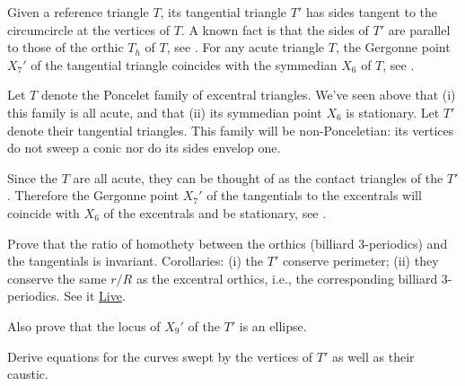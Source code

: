 \begin{exercise}
Given a reference triangle $T$, its tangential triangle $T'$ has sides tangent to the circumcircle at the vertices of $T$. A known fact is that the sides of $T'$ are parallel to those of the orthic $T_h$ of $T$, see \cite[Tangential Triangle]{mw}. For any acute triangle $T$, the Gergonne point $X_7'$ of the tangential triangle coincides with the symmedian $X_6$ of $T$, see \cite[Contact Triangle]{mw}.

Let $T$ denote the Poncelet family of excentral triangles. We've seen above that (i) this family is all acute, and that (ii) its symmedian point $X_6$ is stationary. Let $T'$ denote their tangential triangles. This family will be non-Ponceletian: its vertices do not sweep a conic nor do its sides envelop one.

Since the $T$ are all acute, they can be thought of as the contact triangles of the $T'$. Therefore the Gergonne point $X_7'$ of the tangentials to the excentrals will coincide with $X_6$ of the excentrals and be stationary, see \cite[Contact Triangle]{mw}.

Prove that the ratio of homothety between the orthics (billiard 3-periodics) and the tangentials is invariant. Corollaries: (i) the $T'$ conserve perimeter; (ii) they conserve the same $r/R$ as the excentral orthics, i.e., the corresponding billiard 3-periodics. See it \href{https://bit.ly/3o7JM8V}{Live}.

Also prove that the locus of $X_9'$ of the $T'$ is an ellipse.

Derive equations for the curves swept by the vertices of $T'$ as well as their caustic. 
\end{exercise}

